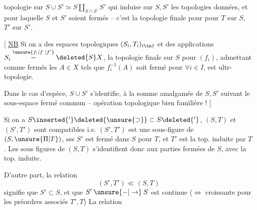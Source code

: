 topologie sur $S\cup S'\simeq S\amalg_{S\cap S'}S'$ qui  induise sur $S,S'$ les topologies données, et pour laquelle $S$ et $S'$ soient fermés -- c'est la topologie finale pour
pour $T$ sur $S$, $T'$ sur $S'$.

[ \uline{NB} Si on a des espaces topologiques $(S_i,T_i)_{i\inJ}$ et des applications $S_i\overset{\unsure{f_i|f^{\cdot}|f'}}{\mathbin{-}}\deleted{S}X$, la topologie finale sur $S$ pour $(f_i)$, admettant comme fermés les $A\in X$ tels que $f_i^{-1}(A)$ soit fermé pour $\forall i\in I$, est  ultr-topologie.


Dans le cas d'espèce, $S\cup S'$ s'identifie, à la somme amalgamée de $S,S'$ suivant le sous-espace fermé commun -- opération topologique bien familière ! ]

Si on a $S\inserted{'}\deleted{\unsure{\supset}}\subset S\deleted{'}$, $(S,T)$ et $(S',T')$ sont compatibles i.e. $(S',T')$ est une sous-figure de $(S,\unsure{\Pi|T})$, sss $S'$ est fermé dans $S$ pour $T$, et $T'$ est la top. induite par $T$. Les sous figures de $(S,T)$ s'identifient donc aux parties fermées de $S$, avec la top. induite.

D'autre part, la relation
\[
 (S',T')\ll(S,T)
\]
signifie que $S'\subset S$, et que $S'\mathbin{\unsure{-|\to}}S$ est continue ($\Longleftrightarrow$ croissante pour les préordres associés  $T',T$) La relation
